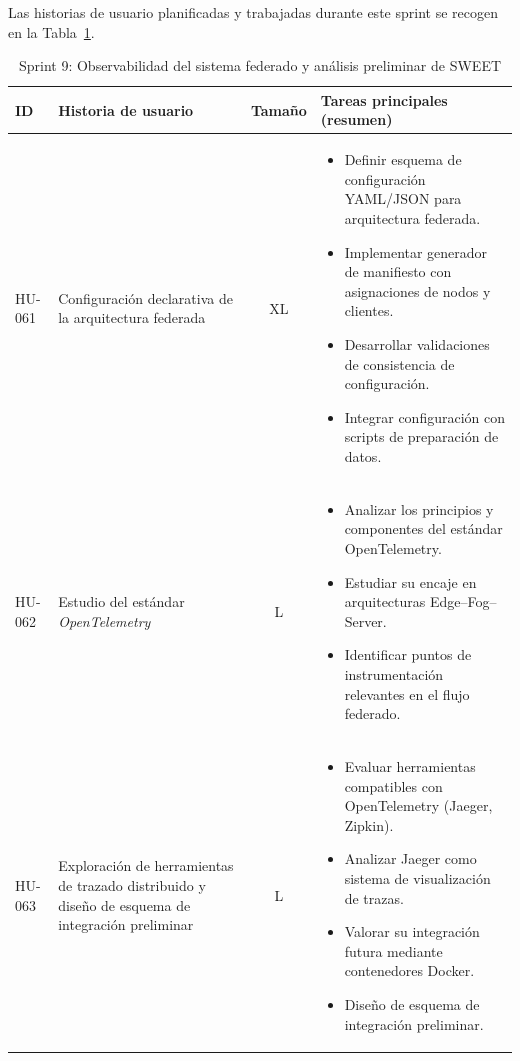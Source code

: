 \documentclass{report}
\begin{document}
Las historias de usuario planificadas y trabajadas durante este sprint se recogen en la Tabla~\ref{tab:sprint9}.
\begin{table}[H]
\centering
\footnotesize
\caption{Sprint 9: Observabilidad del sistema federado y análisis preliminar de SWEET}
\label{tab:sprint9}
\renewcommand{\arraystretch}{1.2}
\setlength{\tabcolsep}{4pt}
\begin{tabular}{|l|p{4.8cm}|c|p{5.6cm}|}
\hline
\textbf{ID} & \textbf{Historia de usuario} & \textbf{Tamaño} & \textbf{Tareas principales (resumen)} \\ \hline

HU-061 &
Configuración declarativa de la arquitectura federada &
XL &
\begin{itemize}\setlength\itemsep{0.15em}
  \item Definir esquema de configuración YAML/JSON para arquitectura federada.
  \item Implementar generador de manifiesto con asignaciones de nodos y clientes.
  \item Desarrollar validaciones de consistencia de configuración.
  \item Integrar configuración con scripts de preparación de datos.
\end{itemize}
\\ \hline

HU-062 &
Estudio del estándar \textit{OpenTelemetry} &
L &
\begin{itemize}\setlength\itemsep{0.15em}
  \item Analizar los principios y componentes del estándar OpenTelemetry.
  \item Estudiar su encaje en arquitecturas Edge--Fog--Server.
  \item Identificar puntos de instrumentación relevantes en el flujo federado.
\end{itemize}
\\ \hline

HU-063 &
Exploración de herramientas de trazado distribuido y diseño de esquema de integración preliminar  &
L &
\begin{itemize}\setlength\itemsep{0.15em}
  \item Evaluar herramientas compatibles con OpenTelemetry (Jaeger, Zipkin).
  \item Analizar Jaeger como sistema de visualización de trazas.
  \item Valorar su integración futura mediante contenedores Docker.
  \item Diseño de esquema de integración preliminar.
\end{itemize}
\\ \hline


\end{tabular}
\end{table}
\end{document}
